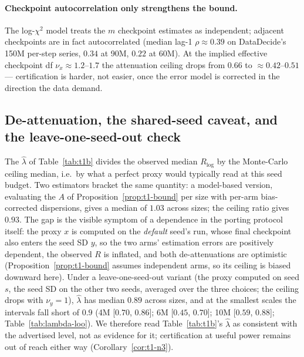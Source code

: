 \paragraph{Checkpoint autocorrelation only strengthens the bound.}
The log-$\chi^2$ model treats the $m$ checkpoint estimates as independent; adjacent
checkpoints are in fact autocorrelated (median lag-1 $\rho \approx 0.39$ on DataDecide's 150M
per-step series, $0.34$ at 90M, $0.22$ at 60M). At the implied effective checkpoint df
$\nu_x \approx 1.2$--$1.7$ the attenuation ceiling drops from $0.66$ to $\approx
0.42$--$0.51$ --- certification is harder, not easier, once the error model is corrected in
the direction the data demand.

\subsection{De-attenuation, the shared-seed caveat, and the leave-one-seed-out check}
\label{app:t1-lambda}

The $\hat\lambda$ of Table~\ref{tab:t1b} divides the observed median $R_{\log}$ by the
Monte-Carlo ceiling median, i.e.\ by what a perfect proxy would typically read at this seed
budget. Two estimators bracket the same quantity: a model-based version, evaluating the $A$ of
Proposition~\ref{prop:t1-bound} per size with per-arm bias-corrected dispersions, gives a
median of $1.03$ across sizes; the ceiling ratio gives $0.93$. The gap is the visible symptom
of a dependence in the porting protocol itself: the proxy $x$ is computed on the
\emph{default} seed's run, whose final checkpoint also enters the seed SD $y$, so the two
arms' estimation errors are positively dependent, the observed $R$ is inflated, and both
de-attenuations are optimistic (Proposition~\ref{prop:t1-bound} assumes independent arms, so
its ceiling is biased downward here). Under a leave-one-seed-out variant (the proxy computed on
seed $s$, the seed SD on the other two seeds, averaged over the three choices; the ceiling
drops with $\nu_y = 1$), $\hat\lambda$ has median $0.89$ across sizes, and at the smallest
scales the intervals fall short of $0.9$ (4M [$0.70$, $0.86$]; 6M [$0.45$, $0.70$]; 10M
[$0.59$, $0.88$]; Table~\ref{tab:lambda-loo}). We therefore read Table~\ref{tab:t1b}'s
$\hat\lambda$ as consistent with the advertised level, not as evidence for it; certification at useful power remains out of reach either way (Corollary~\ref{cor:t1-n3}).


